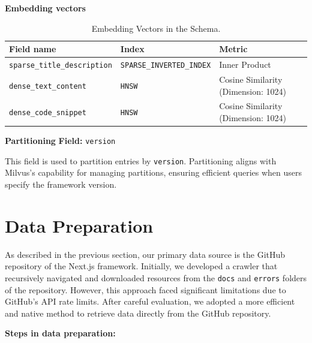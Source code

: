 \textbf{Embedding vectors}
\begin{table}[H]
	\centering
	\label{tab:embedding_vectors}
	\begin{tabular}{lp{4cm}p{5cm}}
		\hline
		\textbf{Field name}                 & \textbf{Index}                  & \textbf{Metric}          \\ \hline
		\texttt{sparse\_title\_description} & \texttt{SPARSE\_INVERTED\_INDEX} & Inner Product            \\ \hline
		\texttt{dense\_text\_content}       & \texttt{HNSW}                   & Cosine Similarity (Dimension: 1024) \\ \hline
		\texttt{dense\_code\_snippet}       & \texttt{HNSW}                   & Cosine Similarity (Dimension: 1024) \\ \hline
	\end{tabular}
	\caption{Embedding Vectors in the Schema.}
\end{table}

\textbf{Partitioning}
\textbf{Field:} \texttt{version}

This field is used to partition entries by \texttt{version}. Partitioning aligns with Milvus's capability for managing partitions, ensuring efficient queries when users specify the framework version.

\section{Data Preparation}

As described in the previous section, our primary data source is the GitHub repository of the Next.js framework. Initially, we developed a crawler that recursively navigated and downloaded resources from the \texttt{docs} and \texttt{errors} folders of the repository. However, this approach faced significant limitations due to GitHub's API rate limits. After careful evaluation, we adopted a more efficient and native method to retrieve data directly from the GitHub repository.

\textbf{Steps in data preparation:}

